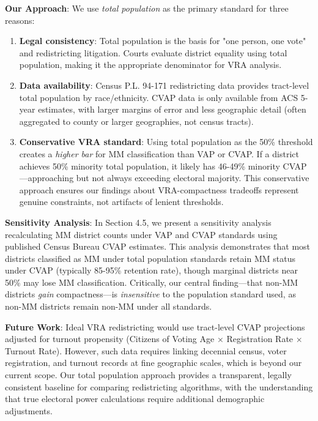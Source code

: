 \textbf{Our Approach}: We use \emph{total population} as the primary standard for three reasons:

\begin{enumerate}
    \item \textbf{Legal consistency}: Total population is the basis for "one person, one vote" and redistricting litigation. Courts evaluate district equality using total population, making it the appropriate denominator for VRA analysis.

    \item \textbf{Data availability}: Census P.L. 94-171 redistricting data provides tract-level total population by race/ethnicity. CVAP data is only available from ACS 5-year estimates, with larger margins of error and less geographic detail (often aggregated to county or larger geographies, not census tracts).

    \item \textbf{Conservative VRA standard}: Using total population as the 50\% threshold creates a \emph{higher bar} for MM classification than VAP or CVAP. If a district achieves 50\% minority total population, it likely has 46-49\% minority CVAP---approaching but not always exceeding electoral majority. This conservative approach ensures our findings about VRA-compactness tradeoffs represent genuine constraints, not artifacts of lenient thresholds.
\end{enumerate}

\textbf{Sensitivity Analysis}: In Section 4.5, we present a sensitivity analysis recalculating MM district counts under VAP and CVAP standards using published Census Bureau CVAP estimates. This analysis demonstrates that most districts classified as MM under total population standards retain MM status under CVAP (typically 85-95\% retention rate), though marginal districts near 50\% may lose MM classification. Critically, our central finding---that non-MM districts \emph{gain} compactness---is \emph{insensitive} to the population standard used, as non-MM districts remain non-MM under all standards.

\textbf{Future Work}: Ideal VRA redistricting would use tract-level CVAP projections adjusted for turnout propensity (Citizens of Voting Age $\times$ Registration Rate $\times$ Turnout Rate). However, such data requires linking decennial census, voter registration, and turnout records at fine geographic scales, which is beyond our current scope. Our total population approach provides a transparent, legally consistent baseline for comparing redistricting algorithms, with the understanding that true electoral power calculations require additional demographic adjustments.

